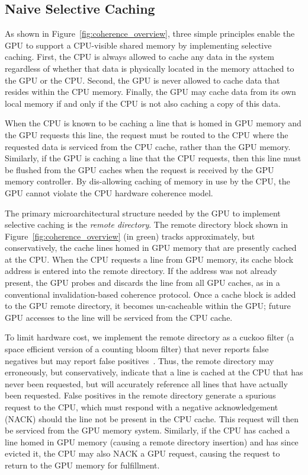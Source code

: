 \subsection{Naive Selective Caching}
\label{naiveselectivecaching}

As shown in Figure~\ref{fig:coherence_overview},
three simple principles enable the GPU to support a CPU-visible shared memory
by implementing selective caching. First, the CPU is always allowed to cache any data in the system regardless 
of whether that data is physically located in the memory attached to the GPU or the CPU\@. 
Second, the GPU is never allowed to cache data that resides within the 
CPU memory.  Finally, the GPU may cache data from its 
own local memory if and only if the CPU is not also caching a copy of this 
data.

When the CPU is known to be caching a line that is homed in GPU memory and the GPU requests
this line, the request must be routed to the CPU where the requested data is serviced 
from the CPU cache, rather than the GPU memory. Similarly, if the GPU is caching a 
line that the CPU requests, then this line must be flushed from the GPU caches when the 
request is received by the GPU memory controller. By dis-allowing caching 
of memory in use by the CPU, the GPU cannot violate the CPU hardware coherence model.

The primary microarchitectural structure needed by the GPU to implement
selective caching is the \emph{remote directory}. The remote directory block
shown in Figure~\ref{fig:coherence_overview} (in green) tracks approximately, but conservatively,
the cache lines homed in GPU  memory that are presently cached at the CPU.
When the CPU requests a line from GPU memory,  its cache block address is  
entered into the remote directory.  If the address was not already present, the GPU
probes and discards the line from all GPU caches, as in a conventional invalidation-based 
coherence protocol.  Once a cache block is added to the GPU remote
directory, it becomes un-cacheable within the GPU; future GPU accesses to the line
will be serviced from the CPU cache.

To limit hardware cost, we implement the remote directory as a cuckoo filter 
(a space efficient version of a counting bloom filter) that never reports
false negatives but may report false positives~\cite{fan2014,bonomi2006}. Thus, the remote directory may erroneously, but conservatively,
indicate that a line is cached at the CPU that has never been requested, but will accurately reference
all lines that have actually been requested.  False positives in the remote directory generate
a spurious request to the CPU, which must respond with a negative acknowledgement (NACK) should the line
not be present in the CPU cache.  This request will then be serviced from the GPU memory
system.  Similarly, if the CPU has cached a line homed in GPU memory (causing a remote directory insertion)
and has since evicted it, the CPU may also NACK a GPU request, causing the request to return to the GPU memory
for fulfillment.

